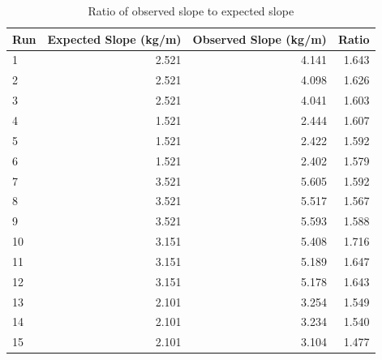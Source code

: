 \begin{table}[ht]
    \centering
    \begin{tabular}{|l|r|r|r|}
        \hline
        Run & Expected Slope (kg/m) & Observed Slope (kg/m) & Ratio \\
        \hline
        1 & 2.521 & 4.141 & 1.643 \\
        2 & 2.521 & 4.098 & 1.626 \\
        3 & 2.521 & 4.041 & 1.603 \\
        \hline
        4 & 1.521 & 2.444 & 1.607 \\
        5 & 1.521 & 2.422 & 1.592 \\
        6 & 1.521 & 2.402 & 1.579 \\
        \hline
        7 & 3.521 & 5.605 & 1.592 \\
        8 & 3.521 & 5.517 & 1.567 \\
        9 & 3.521 & 5.593 & 1.588 \\
        \hline
        10 & 3.151 & 5.408 & 1.716 \\
        11 & 3.151 & 5.189 & 1.647 \\
        12 & 3.151 & 5.178 & 1.643 \\
        \hline
        13 & 2.101 & 3.254 & 1.549 \\
        14 & 2.101 & 3.234 & 1.540 \\
        15 & 2.101 & 3.104 & 1.477 \\
        \hline
    \end{tabular}
    \caption{Ratio of observed slope to expected slope}
    \label{table.10.ratio}
\end{table}
\newpage
